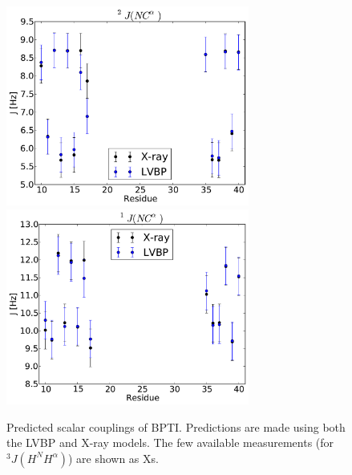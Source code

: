 \documentclass[journal=jacsat,manuscript=article]{achemso}
\begin{document}
\begin{figure}
\includegraphics[width=8cm]{figures/BPTI_couplings_J2_N_CA.pdf}
\includegraphics[width=8cm]{figures/BPTI_couplings_J1_N_CA.pdf}
\caption{
Predicted scalar couplings of BPTI.  Predictions are made using both the LVBP and X-ray models.  The few available measurements (for  $^3J(H^N H^\alpha)$) are shown as Xs.  
}
\label{figure:bpti_couplings}
\end{figure}

\newpage
\end{document}
